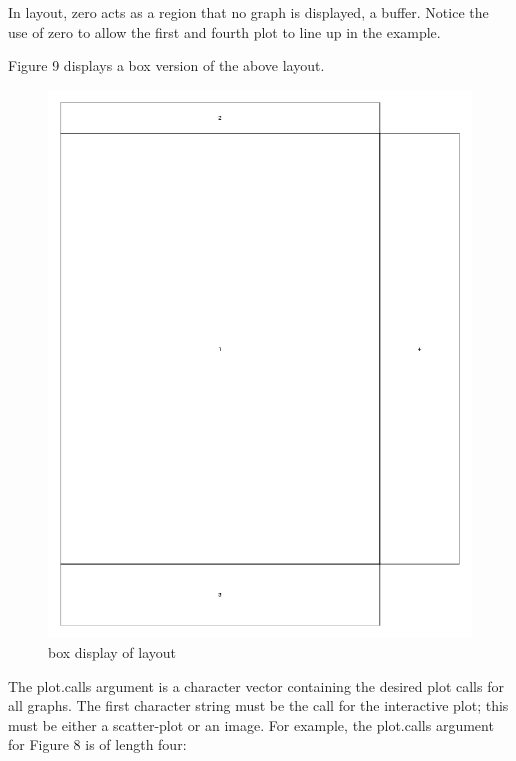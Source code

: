 \documentclass[]{article}
\begin{document}
 In layout, zero acts as a region that no graph is displayed, a buffer. Notice the use of zero to allow the first and fourth plot to line up in the example.

\indent Figure 9 displays a box version of the above layout.
\begin{center}
\begin{figure}
\includegraphics{layoutFile}
\caption{box display of layout}
\end{figure}
\end{center}


\indent The plot.calls argument is a character vector containing the desired plot calls for all graphs. The first character string must be the call for the interactive plot; this must be either a scatter-plot or an image. For example, the plot.calls argument for Figure 8 is of length four: 
\end{document}
